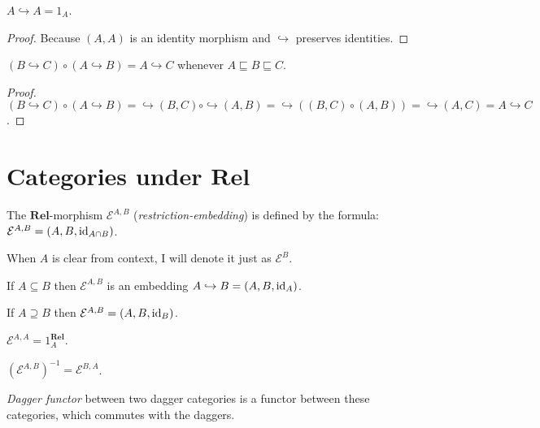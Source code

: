 \begin{prop}
  $A \hookrightarrow A = 1_A$.
\end{prop}

\begin{proof}
  Because $(A , A)$ is an identity morphism and $\hookrightarrow$ preserves
  identities.
\end{proof}

\begin{prop}
  $(B \hookrightarrow C) \circ (A \hookrightarrow B) = A \hookrightarrow C$
  whenever $A \sqsubseteq B \sqsubseteq C$.
\end{prop}

\begin{proof}
  $(B \hookrightarrow C) \circ (A \hookrightarrow B) = \hookrightarrow (B , C)
  \circ \hookrightarrow (A , B) = \hookrightarrow ((B , C) \circ (A , B)) =
  \hookrightarrow (A , C) = A \hookrightarrow C$.
\end{proof}

\section{\texorpdfstring{Categories under $\mathbf{Rel}$}{Categories under Rel}}

\begin{defn}
  The $\mathbf{Rel}$-morphism $\mathcal{E}^{A,B}$
  (\emph{restriction-embedding}) is defined by the formula: $\mathcal{E}^{A,B}
  = (A , B , \operatorname{id}_{A \cap B})$.
  
  When $A$ is clear from context, I will denote it just as $\mathcal{E}^B$.
\end{defn}

\begin{obvious}
If $A \subseteq B$ then $\mathcal{E}^{A,B}$ is an embedding $A \hookrightarrow B
= (A , B , \operatorname{id}_A)$.
\end{obvious}

\begin{obvious}
If $A \supseteq B$ then $\mathcal{E}^{A,B} = (A , B ,
\operatorname{id}_B)$.
\end{obvious}

\begin{obvious}
$\mathcal{E}^{A,A} = 1^{\mathbf{Rel}}_A$.
\end{obvious}

\begin{obvious}
$(\mathcal{E}^{A,B})^{- 1} = \mathcal{E}^{B,A}$.
\end{obvious}

\begin{defn}
\emph{Dagger functor} between two dagger categories is a functor between
these categories, which commutes with the daggers.
\end{defn}

